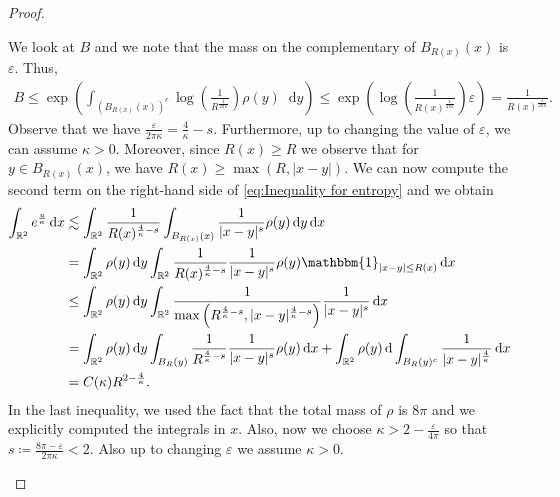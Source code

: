 \documentclass[10pt,a4paper]{amsart}
\newcommand{\R}{{\mathbb{R}}}
\newcommand{\f}{\frac}
\newcommand{\diff}{\mathop{}\!\mathrm{d}}
\newcommand{\ind}{\mathbbm{1}}
\theoremstyle{plain}
\theoremstyle{remark}
\begin{document}
\begin{proof}
\begin{enumeratesteps}
We look at $B$ and we note that the mass on the complementary of $B_{R(x)}(x)$ is $\varepsilon$. Thus, 
\begin{align*}
    B \le  \exp\left( \int_{(B_{R(x)}(x))^c}\log\left(\f{1}{R^{\f{1}{2\pi\kappa}}}\right)\rho(y)\diff y\right) \le \exp\left( \log\left(\f{1}{R(x)^{\f{1}{2\pi\kappa}}}\right) \varepsilon\right)  = \frac{1}{R(x)^{\frac{\varepsilon}{2\pi\kappa}}}.
\end{align*}
%
Observe that we have $\frac{\varepsilon}{2\pi\kappa}=\frac 4\kappa-s$. Furthermore, up to changing the value of $\varepsilon$, we can assume $\kappa>0$. Moreover, since $R(x)\ge R$ we observe that for $y\in B_{R(x)}(x)$, we have $R(x)\ge \max\left(R,|x-y|\right)$. We can now compute the second term on the right-hand side of \eqref{eq:Inequality for entropy} and we obtain 
\begin{align*}
\int_{\R^2}e^{\f{u}{\kappa}}\diff x 
&\lesssim \int_{\R^2} \frac{1}{R(x)^{\frac{4}{\kappa}-s}}\int_{B_{R(x)}(x)}\f{1}{|x-y|^s}\rho(y)\diff y\diff x\\
&=\int_{\R^2}\rho(y)\diff y\int_{\R^2}\frac{1}{R(x)^{\frac{4}{\kappa}-s}}\f{1}{|x-y|^s}\rho(y)\ind_{|x-y|\le R(x)}\diff x \\
&\leq \int_{\R^2}\rho(y)\diff y\int_{\R^2} \frac{1}{\max\left(R^{\frac{4}{\kappa}-s}, |x-y|^{\frac{4}{\kappa}-s}\right)}\f{1}{|x-y|^s}\diff x\\
&=\int_{\R^2}\rho(y)\diff y\int_{B_{R}(y)}\frac{1}{R^{\frac{4}{\kappa}-s}}\f{1}{|x-y|^s}\rho(y)\diff x  + \int_{\R^2}\rho(y)\diff\int_{ B_{R}(y)^c}\f{1}{|x-y|^{\frac{4}{\kappa}}}\diff x \\
&= C(\kappa) R^{2-\frac{4}{\kappa}}.
\end{align*}
In the last inequality, we used the fact that the total mass of $\rho$ is $8\pi$ and we explicitly computed the integrals in $x$.
%
%
\iffalse Also, now we choose $\kappa>2 - \f{\varepsilon}{4\pi}$ so that $s\coloneqq\f{8\pi-\varepsilon}{2\pi\kappa}<2.$ Also up to changing $\varepsilon$ we assume $\kappa>0$. 


\end{enumeratesteps}
\end{proof}
\end{document}

